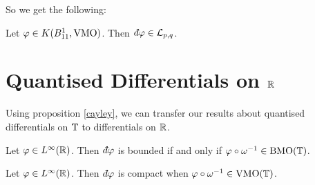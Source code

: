 So we get the following:
\begin{corollary}
    Let $\varphi\in K(B_{11}^1,\operatorname{VMO})$. Then $\qd \varphi \in \mathcal{L}_{p,q}$. 
\end{corollary}

\section{Quantised Differentials on $\mathbb{R}$}
Using proposition \ref{cayley}, we can transfer our results
about quantised differentials on $\mathbb{T}$ to differentials on $\mathbb{R}$.

\begin{proposition}
    Let $\varphi \in L^\infty(\mathbb{R})$. Then $\qd \varphi$
    is bounded if and only if $\varphi \circ \omega^{-1} \in \operatorname{BMO}(\mathbb{T})$.
\end{proposition}
\begin{proposition}
    Let $\varphi \in L^\infty(\mathbb{R})$. Then $\qd \varphi$ is compact
    when $\varphi \circ \omega^{-1} \in \operatorname{VMO}(\mathbb{T})$.
\end{proposition}

